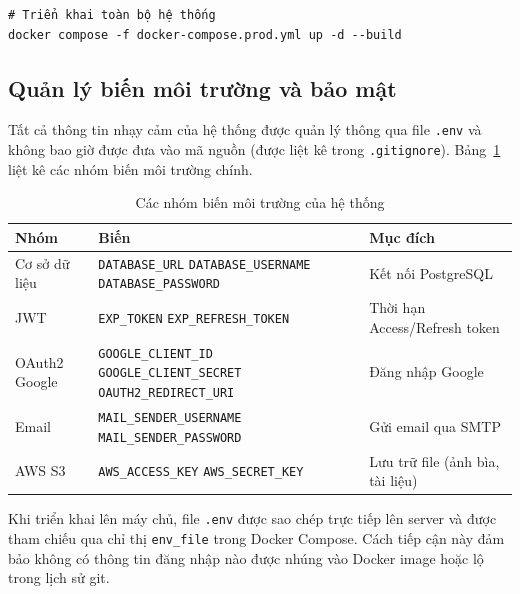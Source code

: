 \begin{verbatim}
# Triển khai toàn bộ hệ thống
docker compose -f docker-compose.prod.yml up -d --build
\end{verbatim}

\subsection{Quản lý biến môi trường và bảo mật}

Tất cả thông tin nhạy cảm của hệ thống được quản lý thông qua file \texttt{.env}
và không bao giờ được đưa vào mã nguồn (được liệt kê trong \texttt{.gitignore}).
Bảng~\ref{tab:env_vars} liệt kê các nhóm biến môi trường chính.

\begin{table}[h]
\centering
\caption{Các nhóm biến môi trường của hệ thống}
\label{tab:env_vars}
\begin{tabular}{|l|p{5cm}|l|}
\hline
\textbf{Nhóm} & \textbf{Biến} & \textbf{Mục đích} \\
\hline
Cơ sở dữ liệu
  & \texttt{DATABASE\_URL} \newline
    \texttt{DATABASE\_USERNAME} \newline
    \texttt{DATABASE\_PASSWORD}
  & Kết nối PostgreSQL \\
\hline
JWT
  & \texttt{EXP\_TOKEN} \newline
    \texttt{EXP\_REFRESH\_TOKEN}
  & Thời hạn Access/Refresh token \\
\hline
OAuth2 Google
  & \texttt{GOOGLE\_CLIENT\_ID} \newline
    \texttt{GOOGLE\_CLIENT\_SECRET} \newline
    \texttt{OAUTH2\_REDIRECT\_URI}
  & Đăng nhập Google \\
\hline
Email
  & \texttt{MAIL\_SENDER\_USERNAME} \newline
    \texttt{MAIL\_SENDER\_PASSWORD}
  & Gửi email qua SMTP \\
\hline
AWS S3
  & \texttt{AWS\_ACCESS\_KEY} \newline
    \texttt{AWS\_SECRET\_KEY}
  & Lưu trữ file (ảnh bìa, tài liệu) \\
\hline
\end{tabular}
\end{table}

Khi triển khai lên máy chủ, file \texttt{.env} được sao chép trực tiếp lên
server và được tham chiếu qua chỉ thị \texttt{env\_file} trong Docker Compose.
Cách tiếp cận này đảm bảo không có thông tin đăng nhập nào được nhúng vào
Docker image hoặc lộ trong lịch sử git.

